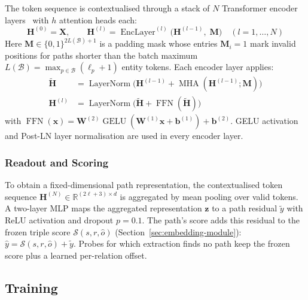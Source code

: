 \documentclass[runningheads]{llncs}
\begin{document}
The token sequence is contextualised through a stack of $N$
Transformer encoder layers~\cite{vaswani2017attention} with $h$ attention heads each:
\begin{equation}
  \mathbf{H}^{(0)} = \mathbf{X},\qquad
  \mathbf{H}^{(l)} = \operatorname{EncLayer}^{(l)}\bigl(\mathbf{H}^{(l-1)},\; \mathbf{M}\bigr)
  \quad (l = 1, \ldots, N)
  \label{eq:transformer}
\end{equation}
Here $\mathbf{M} \in \{0, 1\}^{2L(\mathcal{B})+1}$ is a padding mask
whose entries $\mathbf{M}_i = 1$ mark invalid positions for paths
shorter than the batch maximum $L(\mathcal{B}) = \max_{p \in \mathcal{B}}
(\ell_p + 1)$ entity tokens.
Each encoder layer applies:
\begin{align}
  \tilde{\mathbf{H}} &= \operatorname{LayerNorm}\bigl(
  \mathbf{H}^{(l-1)} + \operatorname{MHA}(\mathbf{H}^{(l-1)}; \mathbf{M})\bigr)
  \label{eq:attn}\\
  \mathbf{H}^{(l)} &= \operatorname{LayerNorm}\bigl(
  \tilde{\mathbf{H}} + \operatorname{FFN}(\tilde{\mathbf{H}})\bigr)
  \label{eq:ffn}
\end{align}
with $\operatorname{FFN}(\mathbf{x}) = \mathbf{W}^{(2)} \operatorname{GELU}(\mathbf{W}^{(1)} \mathbf{x} + \mathbf{b}^{(1)}) + \mathbf{b}^{(2)}$.
GELU \cite{hendrycks2016gaussian} activation
and Post-LN layer normalisation are used in every encoder layer.

\subsubsection{Readout and Scoring}

\label{sec:readout}

To obtain a fixed-dimensional path representation, the contextualised
token sequence $\mathbf{H}^{(N)} \in \mathbb{R}^{(2\ell+3) \times d}$ is
aggregated by mean pooling over valid tokens. A two-layer MLP maps the
aggregated representation $\mathbf{z}$ to a path residual $\tilde{y}$
with ReLU activation and dropout $p = 0.1$. The path's score adds this
residual to the frozen triple score $\mathcal{S}(s, r, \hat{o})$
(Section~\ref{sec:embedding-module}):
$\hat{y} = \mathcal{S}(s, r, \hat{o}) + \tilde{y}$.
Probes for which extraction finds no path keep the frozen score plus a
learned per-relation offset.

\subsection{Training}
\end{document}
